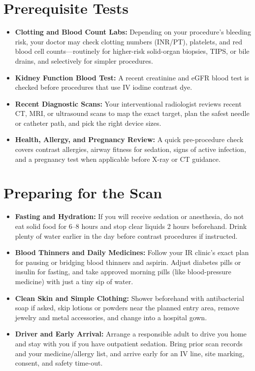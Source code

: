 \section{Prerequisite Tests}

\begin{itemize}
    \item \textbf{Clotting and Blood Count Labs:} Depending on your procedure's bleeding risk, your doctor may check clotting numbers (INR/PT), platelets, and red blood cell counts---routinely for higher-risk solid-organ biopsies, TIPS, or bile drains, and selectively for simpler procedures.
    \item \textbf{Kidney Function Blood Test:} A recent creatinine and eGFR blood test is checked before procedures that use IV iodine contrast dye.
    \item \textbf{Recent Diagnostic Scans:} Your interventional radiologist reviews recent CT, MRI, or ultrasound scans to map the exact target, plan the safest needle or catheter path, and pick the right device sizes.
    \item \textbf{Health, Allergy, and Pregnancy Review:} A quick pre-procedure check covers contrast allergies, airway fitness for sedation, signs of active infection, and a pregnancy test when applicable before X-ray or CT guidance.
\end{itemize}

\section{Preparing for the Scan}

\begin{itemize}
    \item \textbf{Fasting and Hydration:} If you will receive sedation or anesthesia, do not eat solid food for 6--8 hours and stop clear liquids 2 hours beforehand. Drink plenty of water earlier in the day before contrast procedures if instructed.
    \item \textbf{Blood Thinners and Daily Medicines:} Follow your IR clinic's exact plan for pausing or bridging blood thinners and aspirin. Adjust diabetes pills or insulin for fasting, and take approved morning pills (like blood-pressure medicine) with just a tiny sip of water.
    \item \textbf{Clean Skin and Simple Clothing:} Shower beforehand with antibacterial soap if asked, skip lotions or powders near the planned entry area, remove jewelry and metal accessories, and change into a hospital gown.
    \item \textbf{Driver and Early Arrival:} Arrange a responsible adult to drive you home and stay with you if you have outpatient sedation. Bring prior scan records and your medicine/allergy list, and arrive early for an IV line, site marking, consent, and safety time-out.
\end{itemize}

